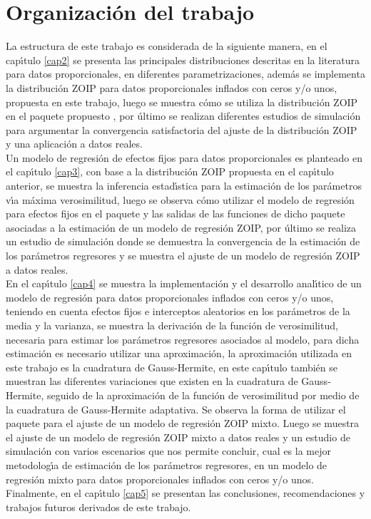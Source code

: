 \section{Organizaci\'{o}n del trabajo}

La estructura de este trabajo es considerada de la siguiente manera, en el cap\'{\i}tulo \ref{cap2} se presenta las principales distribuciones descritas en la literatura para datos proporcionales, en diferentes parametrizaciones, adem\'{a}s se implementa la distribuci\'{o}n ZOIP para datos proporcionales inflados con ceros y/o unos, propuesta en este trabajo, luego se muestra c\'{o}mo se utiliza la distribuci\'{o}n ZOIP en el paquete propuesto , por \'{u}ltimo se realizan di\-fe\-ren\-tes estudios de simulaci\'{o}n para argumentar la convergencia satisfactoria del ajuste de la distribuci\'{o}n ZOIP y una aplicaci\'{o}n a datos reales.\\

Un modelo de regresi\'{o}n de efectos fijos para datos proporcionales es planteado en el cap\'{\i}tulo \ref{cap3}, con base a la distribuci\'{o}n ZOIP propuesta en el cap\'{\i}tulo anterior, se muestra la inferencia estad\'{\i}stica para la estimaci\'{o}n de los par\'{a}metros v\'{\i}a m\'{a}xima verosimilitud, luego se observa c\'{o}mo utilizar el modelo de regresi\'{o}n para efectos fijos en el paquete  y las salidas de las funciones de dicho paquete asociadas a la estimaci\'{o}n de un modelo de regresi\'{o}n ZOIP, por \'{u}ltimo se realiza un estudio de simulaci\'{o}n donde se demuestra la convergencia de la estimaci\'{o}n de los par\'{a}metros regresores y se muestra el ajuste de un modelo de regresi\'{o}n ZOIP a datos reales.\\

En el cap\'{\i}tulo \ref{cap4} se muestra la implementaci\'{o}n y el desarrollo anal\'{\i}tico de un modelo de regresi\'{o}n para datos proporcionales inflados con ceros y/o unos, teniendo en cuenta efectos fijos e interceptos aleatorios en los par\'{a}metros de la media y la varianza, se muestra la derivaci\'{o}n de la funci\'{o}n de verosimilitud, necesaria para estimar los par\'{a}metros regresores asociados al modelo, para dicha estimaci\'{o}n es necesario utilizar una aproximaci\'{o}n, la aproximaci\'{o}n utilizada en este trabajo es la cuadratura de Gauss-Hermite, en este cap\'{\i}tulo tambi\'{e}n se muestran las diferentes variaciones que existen en la cuadratura de Gauss-Hermite, seguido de la aproximaci\'{o}n de la funci\'{o}n de verosimilitud por medio de la cuadratura de Gauss-Hermite adaptativa. Se observa la forma de utilizar el paquete  para el ajuste de un modelo de regresi\'{o}n ZOIP mixto. Luego se muestra el ajuste de un modelo de regresi\'{o}n ZOIP mixto a datos reales y un estudio de simulaci\'{o}n con varios escenarios que nos permite concluir, cual es la mejor metodolog\'{\i}a de estimaci\'{o}n de los par\'{a}metros regresores, en un modelo de regresi\'{o}n mixto para datos proporcionales inflados con ceros y/o unos.\\

Finalmente, en el cap\'{\i}tulo \ref{cap5} se presentan las conclusiones, recomendaciones y trabajos futuros derivados de este trabajo.


 









